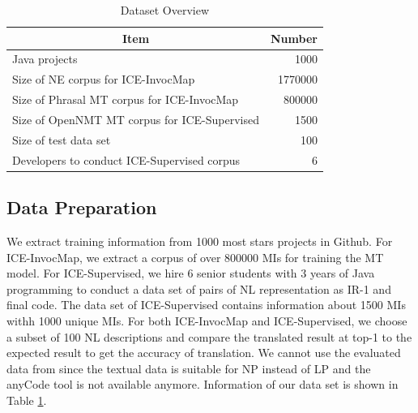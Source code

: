 \documentclass[sigconf,review]{acmart}
\begin{document}
\begin{table}[]
\small
\caption{Dataset Overview}
\label{tblOverview}
\centering
\begin{tabular}{|l|r|}
\hline
\multicolumn{1}{|c|}{\textbf{Item}}                & \multicolumn{1}{c|}{\textbf{Number}} \\ \hline
Java projects                                      & 1000                                 \\ \hline
Size of NE corpus for ICE-InvocMap               & 1770000                              \\ \hline
Size of Phrasal MT corpus for ICE-InvocMap                 & 800000                                                               \\ \hline
Size of OpenNMT MT corpus for ICE-Supervised                 & 1500                                                               \\ \hline
Size of test data set & 100                                  \\ \hline
Developers to conduct ICE-Supervised corpus        & 6                                    \\ \hline

\end{tabular}
\end{table}
\subsection{Data Preparation}
We extract training information from 1000 most stars projects in Github. For ICE-InvocMap, we extract a corpus of over 800000 MIs for training the MT model. For ICE-Supervised, we hire 6 senior students with 3 years of Java programming to conduct a data set of pairs of NL representation as IR-1 and final code. The data set of ICE-Supervised contains information about 1500 MIs withh 1000 unique MIs. For both ICE-InvocMap and ICE-Supervised, we choose a subset of 100 NL descriptions and compare the translated result at top-1 to the expected result to get the accuracy of translation. We cannot use the evaluated data from \cite{007} since the textual data is suitable for NP instead of LP and the anyCode tool is not available anymore. Information of our data set is shown in Table \ref{tblOverview}.
\end{document}
